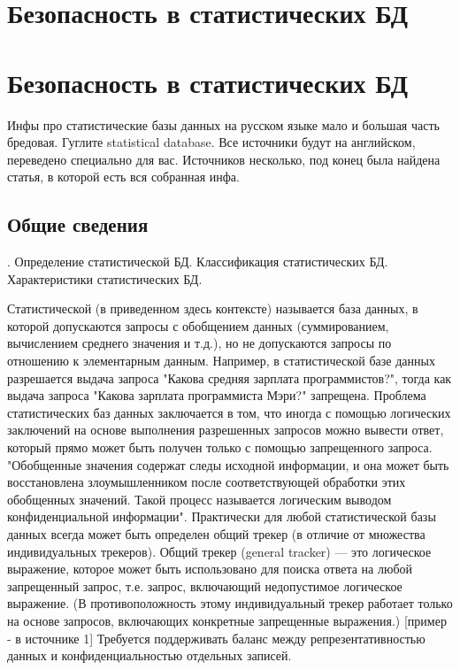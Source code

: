 \section{Безопасность в статистических БД}
\section{Безопасность в статистических БД}

Инфы про статистические базы данных на русском языке мало и большая часть бредовая. Гуглите statistical database. Все источники будут на английском, переведено специально для вас. Источников несколько, под конец была найдена статья, в которой есть вся собранная инфа.

\subsection{Общие сведения}.
Определение статистической БД. Классификация статистических БД. Характеристики статистических БД.

Статистической (в приведенном здесь контексте) называется база данных, в которой допускаются запросы с обобщением данных (суммированием, вычислением среднего значения и т.д.), но не допускаются запросы по отношению к элементарным данным. Например, в статистической базе данных разрешается выдача запроса "Какова средняя зарплата программистов?", тогда как выдача запроса "Какова зарплата программиста Мэри?" запрещена.
Проблема статистических баз данных заключается в том, что иногда с помощью логических заключений на основе выполнения разрешенных запросов можно вывести ответ, который прямо может быть получен только с помощью запрещенного запроса. "Обобщенные значения содержат следы исходной информации, и она может быть восстановлена злоумышленником после соответствующей обработки этих обобщенных значений. Такой процесс называется логическим выводом конфиденциальной информации".
Практически для любой статистической базы данных всегда может быть определен общий трекер (в отличие от множества индивидуальных трекеров). Общий трекер (general tracker) — это логическое выражение, которое может быть использовано для поиска ответа на любой запрещенный запрос, т.е. запрос, включающий недопустимое логическое выражение. (В противоположность этому индивидуальный трекер работает только на основе запросов, включающих конкретные запрещенные выражения.) [пример - в источнике 1]
Требуется поддерживать баланс между репрезентативностью данных и конфиденциальностью отдельных записей.

